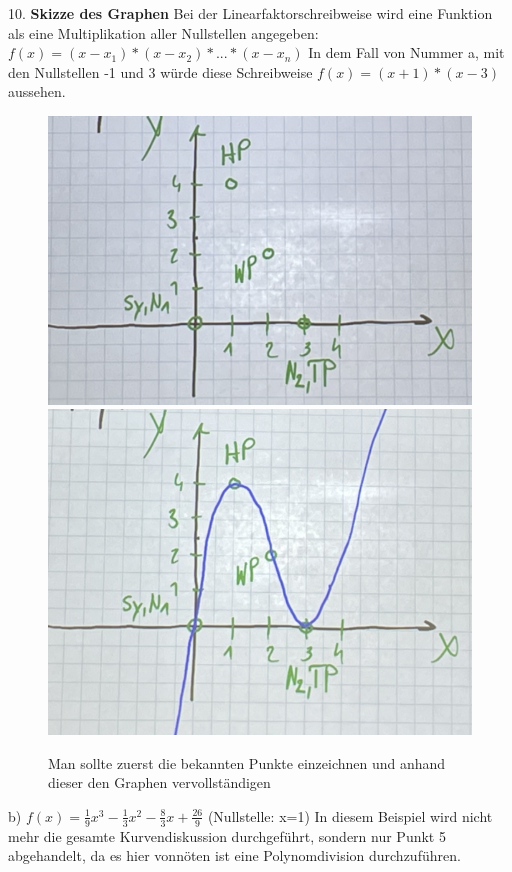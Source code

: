\documentclass{article}
\begin{document}
	10. \textbf{Skizze des Graphen}
	Bei der Linearfaktorschreibweise wird eine Funktion als eine Multiplikation aller Nullstellen angegeben: $f(x)=(x-x_1)*(x-x_2)*...*(x-x_n)$ In dem Fall von Nummer a, mit den Nullstellen -1 und 3 würde diese Schreibweise $f(x)=(x+1)*(x-3)$ aussehen. \\
	\begin{figure}[H]
	\centering
	\includegraphics[scale=0.79]{Bilder/KV_1.png}
	\includegraphics[scale=0.6]{Bilder/KV_2.png}
	\caption{Man sollte zuerst die bekannten Punkte einzeichnen und anhand dieser den Graphen vervollständigen}
	\end{figure}
	b) $f(x)=\frac{1}{9}x^3-\frac{1}{3}x^2-\frac{8}{3}x+\frac{26}{9}$ (Nullstelle: x=1) In diesem Beispiel wird nicht mehr die gesamte Kurvendiskussion durchgeführt, sondern nur Punkt 5 abgehandelt, da es hier vonnöten ist eine Polynomdivision durchzuführen. \\
\end{document}
